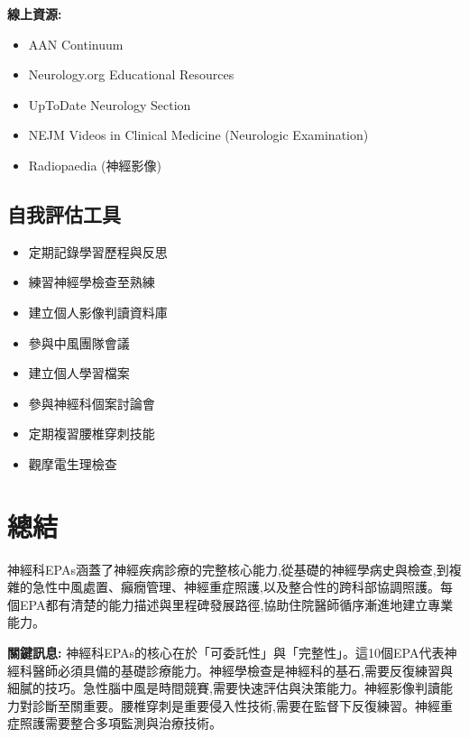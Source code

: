\documentclass[12pt,a4paper]{article}
\begin{document}
\textbf{線上資源:}
\begin{itemize}
    \item AAN Continuum
    \item Neurology.org Educational Resources
    \item UpToDate Neurology Section
    \item NEJM Videos in Clinical Medicine (Neurologic Examination)
    \item Radiopaedia (神經影像)
\end{itemize}

\subsection{自我評估工具}
\begin{itemize}[nosep]
    \item 定期記錄學習歷程與反思
    \item 練習神經學檢查至熟練
    \item 建立個人影像判讀資料庫
    \item 參與中風團隊會議
    \item 建立個人學習檔案
    \item 參與神經科個案討論會
    \item 定期複習腰椎穿刺技能
    \item 觀摩電生理檢查
\end{itemize}

\section{總結}

神經科EPAs涵蓋了神經疾病診療的完整核心能力,從基礎的神經學病史與檢查,到複雜的急性中風處置、癲癇管理、神經重症照護,以及整合性的跨科部協調照護。每個EPA都有清楚的能力描述與里程碑發展路徑,協助住院醫師循序漸進地建立專業能力。

\begin{importantbox}
\textbf{關鍵訊息:} 神經科EPAs的核心在於「可委託性」與「完整性」。這10個EPA代表神經科醫師必須具備的基礎診療能力。神經學檢查是神經科的基石,需要反復練習與細膩的技巧。急性腦中風是時間競賽,需要快速評估與決策能力。神經影像判讀能力對診斷至關重要。腰椎穿刺是重要侵入性技術,需要在監督下反復練習。神經重症照護需要整合多項監測與治療技術。
\end{importantbox}

\end{document}
